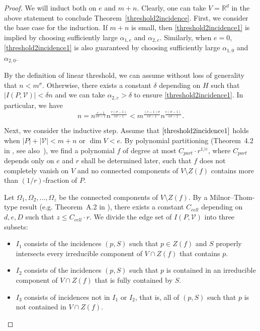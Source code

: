 \documentclass[11pt]{article}
\theoremstyle{definition}
\begin{document}
\begin{proof}

We will induct both on $e$ and $m+n$. Clearly, one can take $V=\mathbb{R}^d$ in the above statement to conclude Theorem~\ref{threshold2incidence}. First, we consider the base case for the induction. If $m+n$ is small, then \eqref{threshold2incidence1} is implied by choosing sufficiently large $\alpha_{1,e}$ and $\alpha_{2,e}$. Similarly, when $e=0$, \eqref{threshold2incidence1} is also guaranteed by choosing sufficiently large $\alpha_{1,0}$ and $\alpha_{2,0}$.

By the definition of linear threshold, we can assume without loss of generality that $n < m^\sigma$. Otherwise, there exists a constant $\delta$ depending on $H$ such that $|I(P,\mathcal{V})| < \delta n$ and we can take $\alpha_{2,e} > \delta$ to ensure \eqref{threshold2incidence1}. In particular, we have\begin{equation}\label{threshold2incidence2}
    n = n^\frac{e-1}{e\sigma-1}n^\frac{e(\sigma-1)}{e\sigma-1} < m^\frac{(e-1)\sigma}{e\sigma-1}n^\frac{e(\sigma-1)}{e\sigma-1}.
\end{equation}

Next, we consider the inductive step. Assume that $\eqref{threshold2incidence1}$ holds when $|P|+|\mathcal{V}| < m + n$ or $\dim V < e$. By polynomial partitioning (Theorem~4.2 in \cite{fox2017semi}, see also~\cite{guth2015erdHos}), we find a polynomial $f$ of degree at most $C_{part} \cdot r^{1/e}$, where $C_{part}$ depends only on $e$ and $r$ shall be determined later, such that $f$ does not completely vanish on $V$ and no connected components of $V \setminus Z(f)$ contains more than $(1/r)$-fraction of $P$.

Let $\Omega_1,\Omega_2,\dots,\Omega_z$ be the connected components of $V\setminus Z(f)$. By a Milnor--Thom-type result (e.g. Theorem~A.2 in \cite{solymosi2012incidence}), there exists a constant $C_{cell}$ depending on $d,e,D$ such that $z \leq C_{cell} \cdot r$. We divide the edge set of $I(P,\mathcal{V})$ into three subsets:
\begin{itemize}
\item $I_1$ consists of the incidences $(p,S)$ such that $p\in Z(f)$ and $S$ properly intersects every irreducible component of $V \cap Z(f)$ that contains $p$.
\item $I_2$ consists of the incidences $(p,S)$ such that $p$ is contained in an irreducible component of $V \cap Z(f)$ that is fully contained by $S$.
\item $I_3$ consists of incidences not in $I_1$ or $I_2$, that is, all of $(p,S)$ such that $p$ is not contained in $V \cap Z(f)$.
\end{itemize}


\end{proof}
\end{document}
